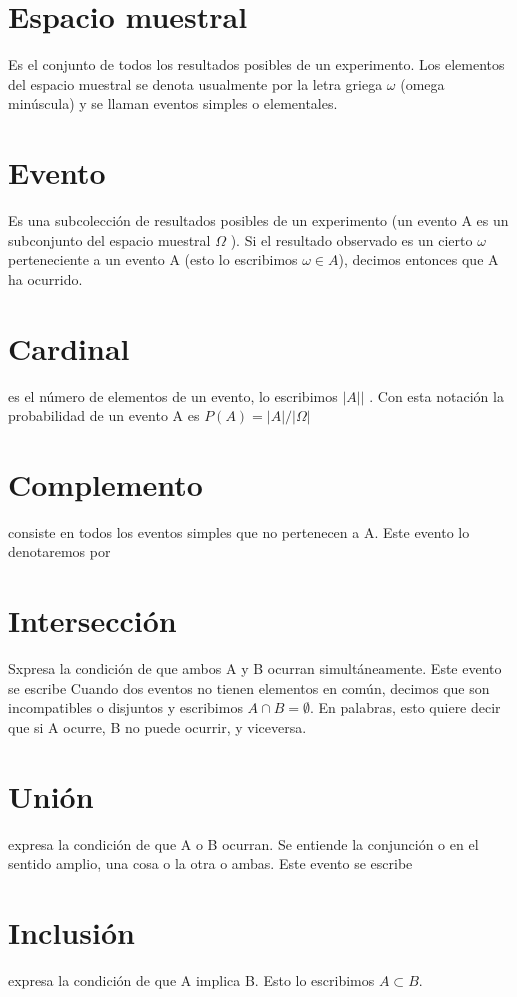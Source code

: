 \documentclass[12pt]{book}
\begin{document}
\section{Espacio muestral}
Es el conjunto de todos los resultados posibles de un experimento. Los elementos del espacio muestral se denota usualmente por la letra griega $\omega $ (omega minúscula) y se llaman eventos simples o elementales.
\section{Evento}
Es una subcolección de resultados posibles de un experimento (un evento A es un subconjunto del espacio muestral $ \Omega $ ). Si el resultado observado es un cierto $ \omega$ perteneciente a un evento A (esto lo escribimos $ \omega \in A $), decimos entonces que A ha ocurrido.

\section{Cardinal}
es el número de elementos de un evento, lo escribimos $ \vert A \vert| $ . Con esta notación la probabilidad de un evento A es $P ( A ) = | A | / | \Omega |$

\section{Complemento}
 consiste en todos los eventos simples que no pertenecen a A. Este evento lo denotaremos por


\section{Intersección}Sxpresa la condición de que ambos A y B ocurran simultáneamente. Este evento se escribe Cuando dos eventos no tienen elementos en común, decimos que son incompatibles o disjuntos y escribimos $A \cap B = \emptyset $. En palabras, esto quiere decir que si A ocurre, B no puede ocurrir, y viceversa.


\section{Unión}expresa la condición de que A o B ocurran. Se entiende la conjunción o en el sentido amplio, una cosa o la otra o ambas. Este evento se escribe


\section{Inclusión} expresa la condición de que A implica B. Esto lo escribimos $A \subset B$.
\end{document}
